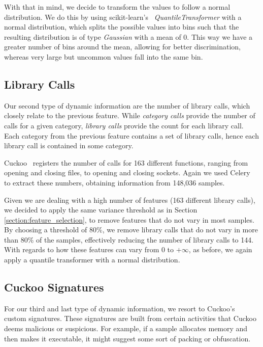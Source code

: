 With that in mind, we decide to transform the values to follow a normal distribution.
We do this by using scikit-learn's~\cite{tool:sklearn} \textit{QuantileTransformer} with a normal distribution, which splits the possible values into bins such that the resulting distribution is of type \textit{Gaussian} with a mean of 0.
This way we have a greater number of bins around the mean, allowing for better discrimination, whereas very large but uncommon values fall into the same bin.

\subsection{Library Calls}
\label{section:improvements_api_unigrams}

Our second type of dynamic information are the number of library calls, which closely relate to the previous feature.
While \textit{category calls} provide the number of calls for a given category, \textit{library calls} provide the count for each library call.
Each category from the previous feature contains a set of library calls, hence each library call is contained in some category.

Cuckoo~\cite{tool:cuckoo} registers the number of calls for 163 different functions, ranging from opening and closing files, to opening and closing sockets.
Again we used Celery~\cite{tool:celery} to extract these numbers, obtaining information from 148,036 samples.

Given we are dealing with a high number of features (163 different library calls), we decided to apply the same variance threshold as in Section \ref{section:feature_selection}, to remove features that do not vary in most samples.
By choosing a threshold of 80\%, we remove library calls that do not vary in more than 80\% of the samples, effectively reducing the number of library calls to 144.
With regards to how these features can vary from 0 to $+\infty$, as before, we again apply a quantile transformer with a normal distribution.

\subsection{Cuckoo Signatures}
\label{section:improvements_signatures}

For our third and last type of dynamic information, we resort to Cuckoo's~\cite{tool:cuckoo} custom signatures.
These signatures are built from certain activities that Cuckoo deems malicious or suspicious.
For example, if a sample allocates memory and then makes it executable, it might suggest some sort of packing or obfuscation.

